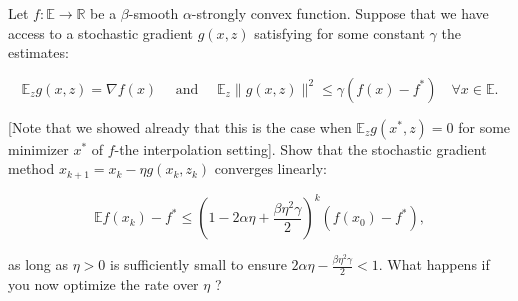 \documentclass[en,hazy,blue,12pt,normal]{elegantnote}
\begin{document}
\begin{homework}
    Let $f: \mathbb{E} \rightarrow \mathbb{R}$ be a $\beta$-smooth $\alpha$-strongly convex function. Suppose that we have access to a stochastic gradient $g(x, z)$ satisfying for some constant $\gamma$ the estimates:

$$
\mathbb{E}_z g(x, z)=\nabla f(x) \quad \text { and } \quad \mathbb{E}_z\|g(x, z)\|^2 \leq \gamma\left(f(x)-f^*\right) \quad \forall x \in \mathbb{E} .
$$

[Note that we showed already that this is the case when $\mathbb{E}_z g\left(x^*, z\right)=0$ for some minimizer $x^*$ of $f$-the interpolation setting]. Show that the stochastic gradient method $x_{k+1}=x_k-\eta g\left(x_k, z_k\right)$ converges linearly:

$$
\mathbb{E} f\left(x_k\right)-f^* \leq\left(1-2 \alpha \eta+\frac{\beta \eta^2 \gamma}{2}\right)^k\left(f\left(x_0\right)-f^*\right),
$$

as long as $\eta>0$ is sufficiently small to ensure $2 \alpha \eta-\frac{\beta \eta^2 \gamma}{2}<1$. What happens if you now optimize the rate over $\eta$ ?
\end{homework}
\end{document}
